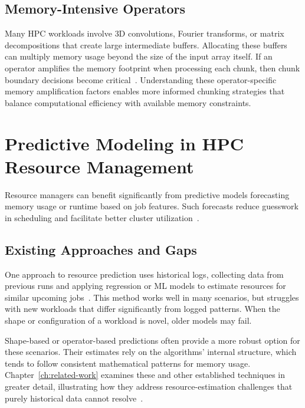 \subsection{Memory-Intensive Operators}
\label{subsec:fundamentals-memory-ops}

Many \ac{HPC} workloads involve \ac{3D} convolutions, Fourier transforms, or matrix decompositions that create large intermediate buffers.
Allocating these buffers can multiply memory usage beyond the size of the input array itself.
If an operator amplifies the memory footprint when processing each chunk, then chunk boundary decisions become critical~\cite{Bader2023,Bader2024}.
Understanding these operator-specific memory amplification factors enables more informed chunking strategies that balance computational efficiency with available memory constraints.


\section{Predictive Modeling in HPC Resource Management}
\label{sec:fundamentals-predictive-modeling}

Resource managers can benefit significantly from predictive models forecasting memory usage or runtime based on job features.
Such forecasts reduce guesswork in scheduling and facilitate better cluster utilization~\cite{Bader2023,Bader2024}.

\subsection{Existing Approaches and Gaps}
\label{subsec:fundamentals-existing-approaches}

One approach to resource prediction uses historical logs, collecting data from previous runs and applying regression or \ac{ML} models to estimate resources for similar upcoming jobs~\cite{Bader2023}.
This method works well in many scenarios, but struggles with new workloads that differ significantly from logged patterns.
When the shape or configuration of a workload is novel, older models may fail.

Shape-based or operator-based predictions often provide a more robust option for these scenarios.
Their estimates rely on the algorithms' internal structure, which tends to follow consistent mathematical patterns for memory usage.
Chapter~\ref{ch:related-work} examines these and other established techniques in greater detail, illustrating how they address resource-estimation challenges that purely historical data cannot resolve~\cite{Bader2024}.


